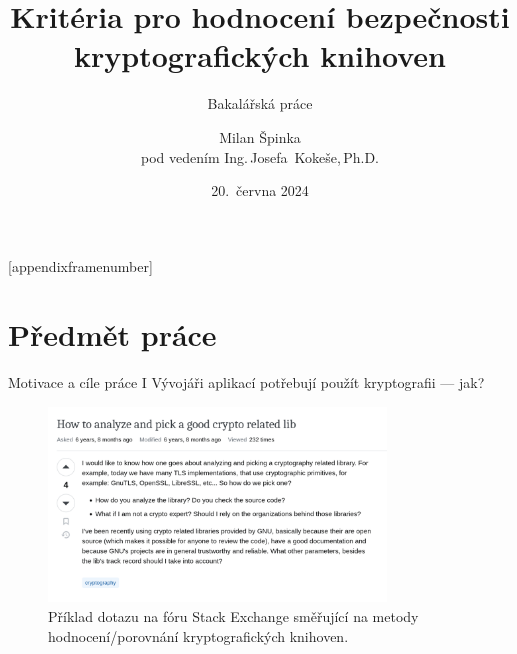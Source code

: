 \documentclass{beamer}
\title[Hodnocení kryptografických knihoven]{Kritéria pro hodnocení bezpečnosti\\kryptografických knihoven}
\subtitle{Bakalářská práce}
\author[Milan Špinka]{\texorpdfstring{Milan Špinka\\[0.5em]pod vedením Ing.\,Josefa~Kokeše,\,Ph.D.}{Milan Špinka}}
\date{20.\ června 2024}
\begin{document}
\maketitle
{}[appendixframenumber]

\section{Předmět práce}

\begin{frame}{Motivace a cíle práce I}
    Vývojáři aplikací potřebují použít kryptografii --- jak?
    \begin{figure}
        \centering
        \includegraphics[width=0.8\textwidth]{media/stackexchange.png}
        \caption{Příklad dotazu na fóru Stack Exchange \cite{stackexchange} směřující na metody hodnocení/porovnání kryptografických knihoven.}
        \label{fig:stackexchange}
    \end{figure}
\end{frame}
\end{document}

